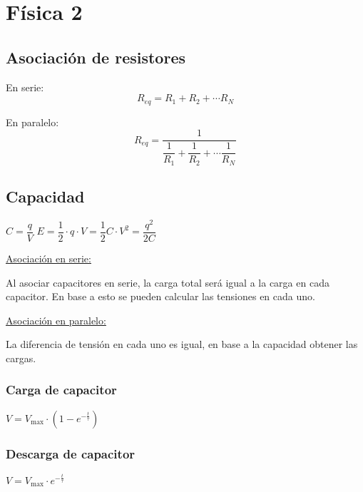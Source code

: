 \section{Física 2}

\subsection{Asociación de resistores}

\begin{multicols}{2}

En serie:
$$R_{eq} = R_1 + R_2 + \cdots R_N$$

En paralelo:
$$R_{eq} = \dfrac{1}{\dfrac{1}{R_1} + \dfrac{1}{R_2} + \cdots \dfrac{1}{R_N}}$$
\end{multicols}

\subsection{Capacidad}

\hfil
$C = \dfrac{q}{V}$
\hfil
$E = \dfrac{1}{2}\cdot q \cdot V = \dfrac{1}{2} C \cdot V^2 = \dfrac{q^2}{2C}$
\hfil

\vspace{\baselineskip}
\noindent
\underline{Asociación en serie:}

Al asociar capacitores en serie, la carga total será igual a la carga en cada capacitor. En base a esto se pueden calcular las tensiones en cada uno.

\vspace{\baselineskip}
\noindent
\underline{Asociación en paralelo:}

La diferencia de tensión en cada uno es igual, en base a la capacidad obtener las cargas.

\begin{multicols}{2}
    \subsubsection*{Carga de capacitor}    
    \hfil
    $V = V_{\max} \cdot \left(1-e^{-\frac{t}{\tau}} \right)$
    \hfil

    \subsubsection*{Descarga de capacitor}
    \hfil
    $V = V_{\max} \cdot e^{-\frac{t}{\tau}}$
    \hfil
\end{multicols}
